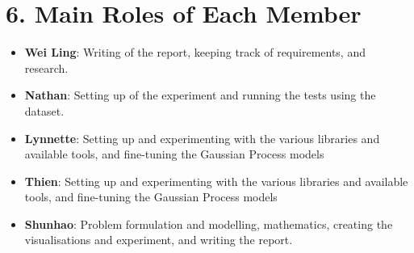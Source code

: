 \documentclass[letterpaper]{article}
\begin{document}
\section{6. Main Roles of Each Member}
\begin{itemize}
\item \textbf{Wei Ling}: 
Writing of the report, keeping track of requirements, and research.
\item \textbf{Nathan}: 
Setting up of the experiment and running the tests using the dataset.
\item \textbf{Lynnette}: 
Setting up and experimenting with the various libraries and available tools, and fine-tuning the Gaussian Process models
\item \textbf{Thien}: 
Setting up and experimenting with the various libraries and available tools, and fine-tuning the Gaussian Process models
\item \textbf{Shunhao}: 
Problem formulation and modelling, mathematics, creating the visualisations and experiment, and writing the report.\cite{manning_introduction_2008}
\end{itemize}



\end{document}
